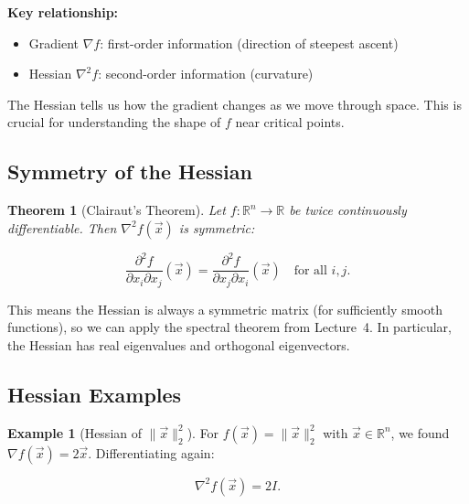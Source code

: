 \documentclass[10pt, twocolumn]{article}
\theoremstyle{definition}
\newtheorem{example}{Example}
\theoremstyle{plain}
\newtheorem{theorem}{Theorem}
\newcommand{\RR}{\mathbb{R}}
\begin{document}
\begin{tcolorbox}[colframe=black!50]
\textbf{Key relationship:}
\begin{itemize}
    \item Gradient $\nabla f$: first-order information (direction of steepest ascent)
    \item Hessian $\nabla^2 f$: second-order information (curvature)
\end{itemize}
The Hessian tells us how the gradient changes as we move through space. This is crucial for understanding the shape of $f$ near critical points.
\end{tcolorbox}

\subsection{Symmetry of the Hessian}

\begin{theorem}[Clairaut's Theorem]
Let $f: \RR^n \to \RR$ be twice continuously differentiable. Then $\nabla^2 f(\vec{x})$ is symmetric:
\begin{result}
\[
    \frac{\partial^2 f}{\partial x_i \partial x_j}(\vec{x}) = \frac{\partial^2 f}{\partial x_j \partial x_i}(\vec{x}) \quad \text{for all } i, j.
\]
\end{result}
\end{theorem}

This means the Hessian is always a symmetric matrix (for sufficiently smooth functions), so we can apply the spectral theorem from Lecture~4. In particular, the Hessian has real eigenvalues and orthogonal eigenvectors.

\subsection{Hessian Examples}

\begin{example}[Hessian of $\|\vec{x}\|_2^2$]
For $f(\vec{x}) = \|\vec{x}\|_2^2$ with $\vec{x} \in \RR^n$, we found $\nabla f(\vec{x}) = 2\vec{x}$. Differentiating again:
\begin{result}
\[
    \nabla^2 f(\vec{x}) = 2I.
\]
\end{result}
\end{example}
\end{document}
